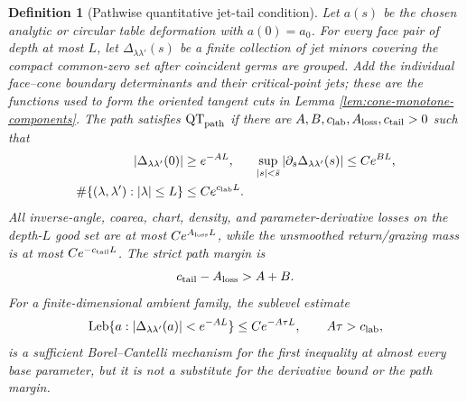 \documentclass[11pt]{article}
\newtheorem{definition}[theorem]{Definition}
\begin{document}
\begin{definition}[Pathwise quantitative jet-tail condition]
\label{def:quantitative-circular-jets}
Let $a(s)$ be the chosen analytic or circular table deformation with
$a(0)=a_0$.  For every face pair of depth at most $L$, let
$\Delta_{\lambda\lambda'}(s)$ be a finite collection of jet minors covering
the compact common-zero set after coincident germs are grouped.  Add the
individual face--cone boundary determinants and their critical-point jets;
these are the functions used to form the oriented tangent cuts in Lemma
\ref{lem:cone-monotone-components}.  The path
satisfies $\mathrm{QT}_{\rm path}$ if there are
$A,B,c_{\rm lab},A_{\rm loss},c_{\rm tail}>0$ such that
\begin{align}
 |\Delta_{\lambda\lambda'}(0)|&\ge e^{-AL},
 &\sup_{|s|<\bar s}|\partial_s\Delta_{\lambda\lambda'}(s)|&\le Ce^{BL},
 \label{eq:pathwise-minor-bounds}\\
 \#\{(\lambda,\lambda'):|\lambda|\le L\}&\le Ce^{c_{\rm lab}L}.
 \label{eq:pathwise-label-count}
\end{align}
All inverse-angle, coarea, chart, density, and parameter-derivative losses on
the depth-$L$ good set are at most $Ce^{A_{\rm loss}L}$, while the unsmoothed
return/grazing mass is at most $Ce^{-c_{\rm tail}L}$.  The strict path margin
is
\begin{equation}
\label{eq:strict-jet-tail-margin}
 c_{\rm tail}-A_{\rm loss}>A+B.
\end{equation}
For a finite-dimensional ambient family, the sublevel estimate
\[
 \operatorname{Leb}\{a:|\Delta_{\lambda\lambda'}(a)|<e^{-AL}\}
 \le Ce^{-A\tau L},\qquad A\tau>c_{\rm lab},
\]
is a sufficient Borel--Cantelli mechanism for the first inequality at almost
every base parameter, but it is not a substitute for the derivative bound or
the path margin.
\end{definition}
\end{document}
